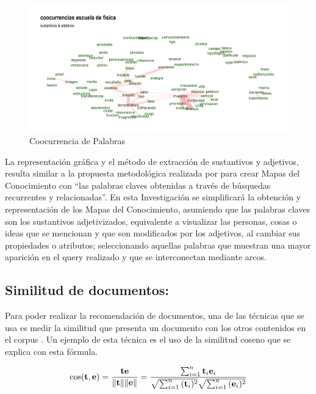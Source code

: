 \documentclass[
  10,
  openany]{book}
\begin{document}
\begin{figure}

{\centering \includegraphics[width=0.9\linewidth]{images/03-marco-teorico/cooc} 

}

\caption{Coocurrencia de Palabras}\label{fig:coocejem}
\end{figure}

La representación gráfica y el método de extracción de sustantivos y adjetivos, resulta similar a la propuesta metodológica realizada por \citep{dueñas2011} para crear Mapas del Conocimiento con ``las palabras claves obtenidas a través de búsquedas recurrentes y relacionadas''. En esta Investigación se simplificará la obtención y representación de los Mapas del Conocimiento, asumiendo que las palabras claves son los sustantivos adjetivizados, equivalente a visualizar las personas, cosas o ideas que se mencionan y que son modificados por los adjetivos, al cambiar sus propiedades o atributos; seleccionando aquellas palabras que muestran una mayor aparición en el query realizado y que se interconectan mediante arcos.

\hypertarget{similitud}{%
\subsection{Similitud de documentos:}\label{similitud}}

Para poder realizar la recomendación de documentos, una de las técnicas que se usa es medir la similitud que presenta un documento con los otros contenidos en el corpus \citep{aggarwal2018a} . Un ejemplo de esta técnica es el uso de la similitud coseno que se explica con esta fórmula.

\begin{equation}
\cos ({\bf t},{\bf e})= {{\bf t} {\bf e} \over \|{\bf t}\| \|{\bf e}\|} = \frac{ \sum_{i=1}^{n}{{\bf t}_i{\bf e}_i} }{ \sqrt{\sum_{i=1}^{n}{({\bf t}_i)^2}} \sqrt{\sum_{i=1}^{n}{({\bf e}_i)^2}} }
\end{equation}
\end{document}
